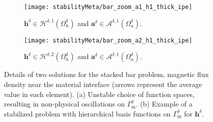 \documentclass[journal]{IEEEtran}
\renewcommand{\vec}[1]{\boldsymbol{#1}} %
\newcommand{\Oad}{\Omega_a^\delta}
\newcommand{\Ohd}{\Omega_h^\delta}
\newcommand{\Gmd}{\Gamma_\text{m}^\delta}
\newcommand{\hspdone}{\mathcal{H}^{\delta,1}}
\newcommand{\aspdone}{\mathcal{A}^{\delta,1}}
\newcommand{\hspdtwo}{\mathcal{H}^{\delta,2}}
\newcommand{\ad}{\vec a^{\delta}}
\newcommand{\hd}{\vec h^{\delta}}
\begin{document}
\begin{figure}[h!]
\centering
            \begin{subfigure}[b]{\linewidth}
            \centering
		\texttt{[image: stabilityMeta/bar\_zoom\_a1\_h1\_thick\_ipe]}
		\caption{$\hd\in \hspdone(\Ohd)$ and $\ad\in \aspdone(\Oad)$.}
		\label{bar_zoom_a1_h1}
        \end{subfigure}
\begin{subfigure}[b]{\linewidth}  
            \centering 
		\texttt{[image: stabilityMeta/bar\_zoom\_a2\_h1\_thick\_ipe]}
		\caption{$\hd\in \hspdtwo(\Ohd)$ and $\ad\in \aspdone(\Oad)$.}
		\label{bar_zoom_a2_h1}	
      \end{subfigure}
        \caption{Details of two solutions for the stacked bar problem, magnetic flux density near the material interface (arrows represent the average value in each element). (a) Unstable choice of function spaces, resulting in non-physical oscillations on $\Gmd$. (b) Example of a stabilized problem with hierarchical basis functions on $\Gmd$ for $\hd$.}
        \label{bar_b_zoom}
\end{figure}
\end{document}
